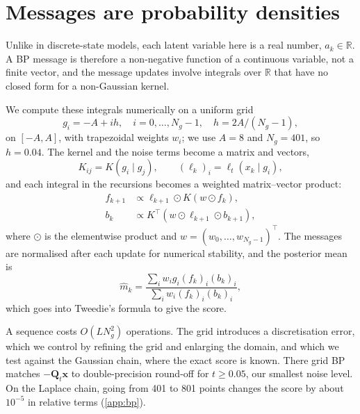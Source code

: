 \section{Messages are probability densities}
\label{sec:grid}

Unlike in discrete-state models, each latent variable here is a real number, $a_k\in\mathbb R$. A BP message is
therefore a non-negative function of a continuous variable, not a finite vector, and the message updates involve
integrals over $\mathbb R$ that have no closed form for a non-Gaussian kernel.

We compute these integrals numerically on a uniform grid
\begin{equation}
    g_i=-A+ih,\quad i=0,\ldots,N_g-1,\quad h=2A/(N_g-1),
\end{equation}
on $[-A,A]$, with trapezoidal weights $w_i$; we use $A=8$ and $N_g=401$, so $h=0.04$. The kernel and the noise terms
become a matrix and vectors,
\begin{equation}
    K_{ij}=K(g_i\mid g_j),
    \qquad
    (\ell_k)_i=\ell_t(x_k\mid g_i),
\end{equation}
and each integral in the recursions becomes a weighted matrix--vector product:
\begin{align}
    f_{k+1}
    &\propto
    \ell_{k+1}\odot K(w\odot f_k),\\
    b_k
    &\propto
    K^\top(w\odot\ell_{k+1}\odot b_{k+1}),
\end{align}
where $\odot$ is the elementwise product and $w=(w_0,\ldots,w_{N_g-1})^\top$. The messages are normalised after each
update for numerical stability, and the posterior mean is
\begin{equation}
    \widehat m_k
    =
    \frac{\sum_i w_i g_i(f_k)_i(b_k)_i}
         {\sum_i w_i(f_k)_i(b_k)_i},
\end{equation}
which goes into Tweedie's formula to give the score.

A sequence costs $O(LN_g^2)$ operations. The grid introduces a discretisation error, which we control by refining the
grid and enlarging the domain, and which we test against the Gaussian chain, where the exact score is known. There grid
BP matches $-\mathbf Q_t\mathbf x$ to double-precision round-off for $t\geq0.05$, our smallest noise level. On the
Laplace chain, going from 401 to 801 points changes the score by about $10^{-5}$ in relative terms (\cref{app:bp}).

